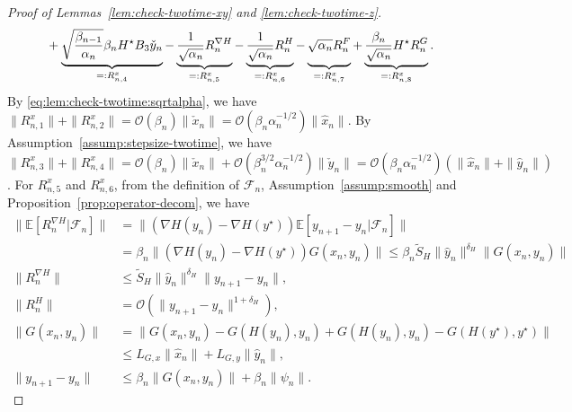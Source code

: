 \documentclass[11pt]{article}
\theoremstyle{plain}
\theoremstyle{definition}
\def\LGx{{L}_{G,x}}
\def\LGy{{L}_{G,y}}
\def\Hsmooth{{\delta_H}}
\def\nablaH{\nabla H}
\def\Hholder{{\widetilde{S}_H}}
\def\FM{{\mathcal F}}
\def\OM{{\mathcal O}}
\def\EB{{\mathbb E}}
\newcommand{\xhat}{{\hat{x}}}
\newcommand{\yhat}{{\hat{y}}}
\newcommand{\xcheck}{{\check{x}}}
\newcommand{\ycheck}{{\check{y}}}
\newcommand{\xx}{{x}}
\newcommand{\yy}{{y}}
\begin{document}
\begin{appendix}
\begin{proof}[Proof of Lemmas~\ref{lem:check-twotime-xy} and \ref{lem:check-twotime-z}]
\begin{align}
\begin{split}
        & \qquad 
        + \underbrace{ \sqrt{ \frac{\beta_{n-1}}{\alpha_{n}} } \beta_{n} H^\star B_3 \ycheck_{n} 
            \vphantom{\left( \sqrt{ \frac{\alpha_{n-1}}{\alpha_{n}} } \right) } }_{=: R_{n,4}^x} 
        - \underbrace{ \frac{1}{ \sqrt{\alpha_{n}} } R_{n}^{\nablaH} }_{=: R_{n,5}^x} 
        - \underbrace{ \frac{1}{\sqrt{\alpha_{n}}} R_{n}^{H} }_{=: R_{n,6}^x} 
        - \underbrace{ \sqrt{\alpha_{n}} R_{n}^F 
            \vphantom{\frac{\beta_{n}}{\sqrt{ \alpha_{n} } } } }_{=:R_{n,7}^x } 
        + \underbrace{ \frac{\beta_{n}}{\sqrt{ \alpha_{n} } } H^\star R_{n}^G }_{=:R_{n,8}^x}.
    \end{split}
\end{align}
By \eqref{eq:lem:check-twotime:sqrtalpha}, we have
$\| R_{n,1}^x \| + \| R_{n,2}^x \| = \OM(\beta_{n}) \| \xcheck_{n} \| = \OM(\beta_{n} \alpha_{n}^{-1/2} ) \| \xhat_{n} \| $.
By Assumption~\ref{assump:stepsize-twotime}, we have
$\| R_{n,3}^x \| + \| R_{n,4}^x \| = \OM(\beta_{n}) \| \xcheck_{n} \| + \OM ( \beta_{n}^{3/2} \alpha_{n}^{-1/2} ) \| \ycheck_{n} \|
= \OM(\beta_{n} \alpha_{n}^{-1/2} ) ( \| \xhat_{n} \| + \| \yhat_{n} \| ) $.
For $R_{n,5}^x$ and $R_{n,6}^x$,
from the definition of $\FM_{n}$, Assumption~\ref{assump:smooth} and Proposition~\ref{prop:operator-decom}, we have
\begin{align*}
    \| \EB [ R_{n}^{\nablaH} | \FM_{n} ] \| 
    & = \| (\nablaH (\yy_{n}) - \nablaH (\yy^\star)) \EB[ \yy_{n+1} - \yy_{n} | \FM_{n} ] \| \\
    & = \beta_{n} \| (\nablaH (\yy_{n}) - \nablaH (\yy^\star)) G(\xx_{n}, \yy_{n}) \| 
    \le \beta_{n} \Hholder \|  \yhat_{n} \|^\Hsmooth \| G(\xx_{n}, \yy_{n}) \| \\
    \| R_{n}^{\nablaH} \| 
    & \le \Hholder \| \yhat_{n} \|^{\Hsmooth}  \| \yy_{n+1} - \yy_{n} \|  , \\
    \| R_{n}^H \| 
    & = \OM ( \| \yy_{n+1} - \yy_{n} \|^{1+\Hsmooth} ), \\
    \| G(\xx_{n}, \yy_{n}) \|
    & = \|  G(\xx_{n}, \yy_{n}) - G( H(\yy_{n}), \yy_{n} ) + G( H(\yy_{n}), \yy_{n} ) - G( H(\yy^\star), \yy^\star ) \| \\
    & \le  \LGx \| \xhat_{n} \| +  \LGy \| \yhat_{n} \|, \\
    \| \yy_{n+1} - \yy_{n} \| 
    & \le \beta_{n} \| G(\xx_{n}, \yy_{n}) \| + \beta_{n} \| \psi_{n} \|.

\end{align*}
\end{proof}
\end{appendix}
\end{document}
